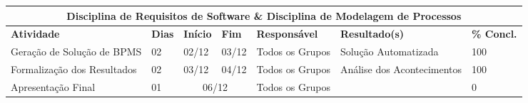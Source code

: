 \begin{center}
	\begin{tabular}{|m{6cm}|m{1cm}|m{1cm}|m{1cm}|m{4cm}|m{6cm}|m{2cm}|}
	\hline
	\multicolumn{7}{|c|}{Disciplina de Requisitos de Software \& Disciplina de Modelagem de Processos} \\ \hline
	\textbf{Atividade} & \textbf{Dias} & \textbf{Início} & \textbf{Fim} & \textbf{Responsável} & \textbf{Resultado(s)} & \textbf{\% Concl.} \\ \hline
	Geração de Solução de BPMS & 02 & 02/12 & 03/12 & Todos os Grupos & Solução Automatizada & 100 \\ \hline
	Formalização dos Resultados & 02 & 03/12 & 04/12 & Todos os Grupos & Análise dos Acontecimentos & 100 \\ \hline
	Apresentação Final & 01 & \multicolumn{2}{c|}{06/12} & Todos os Grupos & & 0 \\ \hline
	\end{tabular}
\end{center}